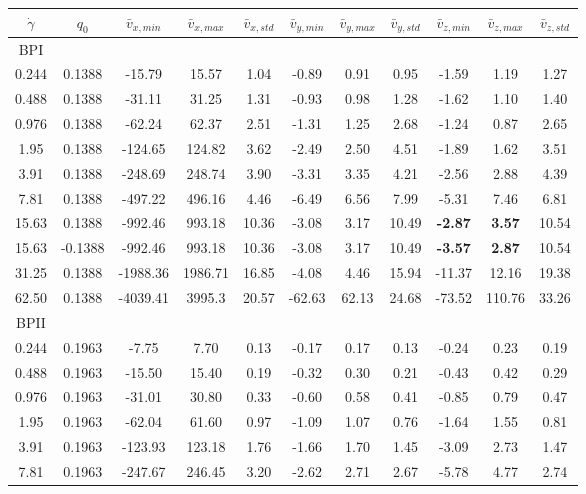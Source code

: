 \documentclass[aps,pre,reprint,superscriptaddress, twocolumn]{revtex4}
\begin{document}
\appendix*

\begin{table}
\begin{tabular}{|c|| c || c |c |c||c| c| c||c| c| c|}
\hline
$\dot{\gamma}$ & $q_0$ & $\bar{v}_{x,min}$ & $\bar{v}_{x,max}$ & $\bar{v}_{x,std}$ & $\bar{v}_{y,min}$ & $\bar{v}_{y,max}$ & $\bar{v}_{y,std}$ & $\bar{v}_{z,min}$ & $\bar{v}_{z,max}$ & $\bar{v}_{z,std}$ \\
\hline
BPI \\
\hline
0.244 & 0.1388 &-15.79 &15.57 &1.04 &-0.89 &0.91 &0.95 &-1.59 &1.19 &1.27 \\
0.488 &0.1388 &-31.11 &31.25 &1.31 &-0.93 &0.98 &1.28 &-1.62 &1.10 &1.40 \\
0.976 &0.1388 &-62.24 &62.37 &2.51 &-1.31 &1.25 &2.68 &-1.24 &0.87 &2.65 \\
1.95 & 0.1388 &-124.65 &124.82 &3.62&  -2.49 &2.50 &4.51 &-1.89 & 1.62 &3.51 \\
3.91 &0.1388 &-248.69 &248.74 &3.90&  -3.31 &3.35 &4.21 &-2.56 & 2.88 &4.39 \\
7.81 &0.1388 &-497.22 &496.16 &4.46 &-6.49 &6.56 &7.99 &-5.31 & 7.46 &6.81 \\ 
15.63 &0.1388 &-992.46 &993.18 &10.36 &-3.08 &3.17 &10.49 &\bf{-2.87} & \bf{3.57} &10.54 \\
15.63 &-0.1388 &-992.46 &993.18 &10.36 &-3.08 &3.17 &10.49 &\bf{-3.57} & \bf{2.87} &10.54 \\
31.25 &0.1388 & -1988.36 &1986.71 &16.85 &-4.08 &4.46 &15.94 &-11.37 & 12.16 &19.38\\
62.50 &0.1388 & -4039.41 &3995.3  & 20.57 & -62.63 & 62.13 & 24.68 &-73.52 & 110.76 & 33.26 \\
\hline
BPII \\
\hline
0.244 &0.1963 &-7.75 &7.70 &0.13 &-0.17 &0.17 &0.13 &-0.24 &0.23 &0.19 \\
0.488 &0.1963 &-15.50 &15.40 &0.19 &-0.32 &0.30 &0.21 &-0.43 &0.42 &0.29 \\
0.976 &0.1963 &-31.01 &30.80 &0.33 &-0.60 &0.58 &0.41 &-0.85 &0.79 &0.47 \\
1.95 & 0.1963 &-62.04  &61.60 & 0.97 & -1.09 &1.07 & 0.76 & -1.64 & 1.55 & 0.81\\
3.91 & 0.1963 &-123.93 &123.18 & 1.76 &-1.66 &1.70 & 1.45 &-3.09& 2.73 &1.47\\
7.81 &0.1963  &-247.67 &246.45 & 3.20 &-2.62 &2.71 & 2.67 &-5.78 & 4.77 &2.74\\

\end{tabular}
\end{table}
\end{document}
